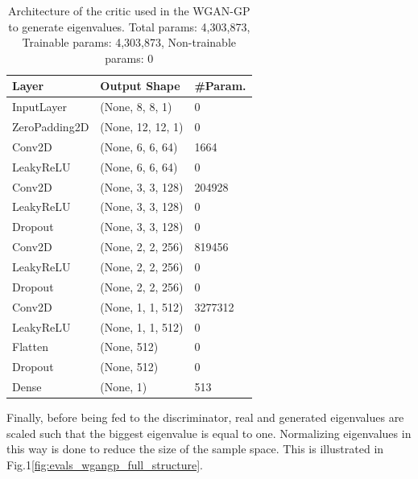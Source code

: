 \documentclass{article}
\begin{document}
\begin{table}[]
    \begin{tabular}{|l|l|l|}
    \hline
    \textbf{Layer} & \textbf{Output Shape} & \textbf{\#Param.} \\ \hline
    InputLayer     & (None, 8, 8, 1)       & 0                 \\ \hline
    ZeroPadding2D  & (None, 12, 12, 1)     & 0                 \\ \hline
    Conv2D         & (None, 6, 6, 64)      & 1664              \\ \hline
    LeakyReLU      & (None, 6, 6, 64)      & 0                 \\ \hline
    Conv2D         & (None, 3, 3, 128)     & 204928            \\ \hline
    LeakyReLU      & (None, 3, 3, 128)     & 0                 \\ \hline
    Dropout        & (None, 3, 3, 128)     & 0                 \\ \hline
    Conv2D         & (None, 2, 2, 256)     & 819456            \\ \hline
    LeakyReLU      & (None, 2, 2, 256)     & 0                 \\ \hline
    Dropout        & (None, 2, 2, 256)     & 0                 \\ \hline
    Conv2D         & (None, 1, 1, 512)     & 3277312           \\ \hline
    LeakyReLU      & (None, 1, 1, 512)     & 0                 \\ \hline
    Flatten        & (None, 512)           & 0                 \\ \hline
    Dropout        & (None, 512)           & 0                 \\ \hline
    Dense          & (None, 1)             & 513               \\ \hline                               
    \end{tabular}
    \caption{Architecture of the critic used in the WGAN-GP to generate eigenvalues. Total params: 4,303,873, Trainable params: 4,303,873, Non-trainable params: 0}
    \label{tab:evals_critic_WGANGP_architecture}
\end{table}


Finally, before being fed to the discriminator, real and generated eigenvalues are scaled such that the biggest eigenvalue is equal to one. Normalizing eigenvalues in this way is done to reduce the size of the sample space. This is illustrated in Fig.1\ref{fig:evals_wgangp_full_structure}.
\end{document}
